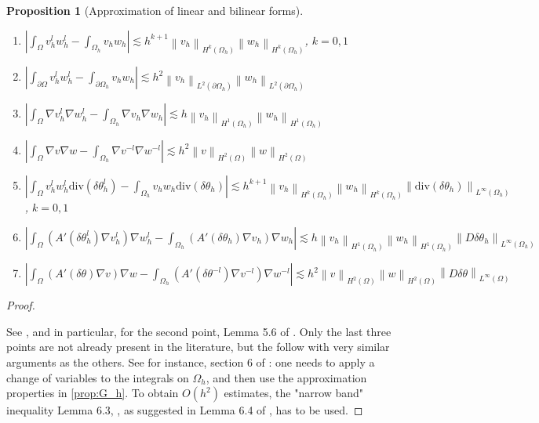 \documentclass[english,a4paper,9pt,oneside]{scrbook}	%
\theoremstyle{break}
\newtheorem{prop}[equation]{Proposition}
\newenvironment{mproof}[1][\proofname]{%
  \begin{proof}[#1]$ $\par\nobreak\ignorespaces
}{%
  \end{proof}
}
\renewcommand*{\proofname}{Proof}
\theoremstyle{remark}
\newcommand{\ds}{\displaystyle}
\newcommand{\norm}[1]{\left\lVert#1\right\rVert}
\newcommand{\te}{\theta}
\newcommand{\dive}{\text{div}}
\begin{document}
\begin{appendices}
\begin{prop}[Approximation of linear and bilinear forms]
\begin{enumerate}
	\item $\ds \left | \int_\Omega v_h^lw_h^l - \int_{\Omega_h}v_hw_h\right |\lesssim h^{k+1} \norm{v_h}_{H^k(\Omega_h)}\norm{w_h}_{H^k(\Omega_h)}$, $k=0,1$
	\item $\ds \left | \int_{\partial \Omega} v_h^lw_h^l - \int_{\partial \Omega_h}v_hw_h\right |\lesssim h^2 \norm{v_h}_{L^2(\partial \Omega_h)}\norm{w_h}_{L^2(\partial \Omega_h)}$
	\item $\ds \left | \int_\Omega \nabla v_h^l\nabla w_h^l - \int_{\Omega_h}\nabla v_h\nabla w_h\right |\lesssim h \norm{v_h}_{H^1(\Omega_h)}\norm{w_h}_{H^1(\Omega_h)}$
	\item $\ds \left | \int_\Omega \nabla v\nabla w - \int_{\Omega_h}\nabla v^{-l}\nabla w^{-l}\right |\lesssim h^2 \norm{v}_{H^2(\Omega)}\norm{w}_{H^2(\Omega)}$
	\item $\ds \left | \int_\Omega v_h^l w_h^l \dive(\delta  \te_h^l) - \int_{\Omega_h}v_h w_h \dive(\delta \te_h)\right |\lesssim h^{k+1} \norm{v_h}_{H^k(\Omega_h)}\norm{w_h}_{H^k(\Omega_h)} \norm{\dive(\delta \te_h)}_{L^\infty(\Omega_h)}$, $k=0,1$
	\item $\ds \left | \int_\Omega (A'(\delta	\te_h^l)\nabla v_h^l)\nabla w_h^l - \int_{\Omega_h}(A'(\delta	\te_h)\nabla v_h)\nabla w_h\right |\lesssim h \norm{v_h}_{H^1(\Omega_h)}\norm{w_h}_{H^1(\Omega_h)}\norm{D\delta \te_h}_{L^\infty(\Omega_h)}$
	\item $\ds \left | \int_\Omega (A'(\delta	\te)\nabla v)\nabla w - \int_{\Omega_h}(A'(\delta	\te^{-l})\nabla v^{-l})\nabla w^{-l}\right |\lesssim h^2 \norm{v}_{H^2(\Omega)}\norm{w}_{H^2(\Omega)}\norm{D\delta \te}_{L^\infty(\Omega)}$
\end{enumerate}
\end{prop}

\begin{mproof}
See \cite{edelmann}, and in particular, for the second point, Lemma 5.6 of \cite{kovacs}. Only the last three points are not already present in the literature, but the follow with very similar arguments as the others. See for instance, section 6 of \cite{elliott}: one needs to apply a change of variables to the integrals on $\Omega_h$, and then use the approximation properties in \cref{prop:G_h}. To obtain $O(h^2)$ estimates, the "narrow band" inequality Lemma 6.3, \cite{elliott}, as suggested in  Lemma 6.4 of \cite{elliott}, has to be used.


\end{mproof}
\end{appendices}
\end{document}
